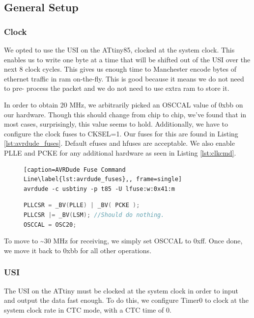 \documentclass{article}
\begin{document}
\subsection{General Setup}

\subsubsection{Clock}
We opted to
use the USI on the ATtiny85, clocked at the system clock.  This enables us to
write one byte at a time that will be shifted out of the USI over the next 8
clock cycles.  This gives us enough time to Manchester encode bytes of ethernet
traffic in ram on-the-fly.  This is good because it means we do not need to pre-
process the packet and we do not need to use extra ram to store it.

In order to obtain 20 MHz, we arbitrarily picked an OSCCAL value of 0xbb on our
hardware.  Though this should change from chip to chip, we've found that in most
cases, surprisingly, this value seems to hold.  Additionally, we have to configure
the clock fuses to CKSEL=1.  Our fuses for this are found in Listing \ref{lst:avrdude_fuses}.
Default efuses and hfuses are acceptable.  We also enable PLLE and PCKE for any additional
hardware as seen in Listing \ref{lst:clkcmd}.

\begin{figure}
\begin{lstlisting}[caption=AVRDude Fuse Command Line\label{lst:avrdude_fuses},, frame=single]
avrdude -c usbtiny -p t85 -U lfuse:w:0x41:m
\end{lstlisting}
\end{figure}

\begin{figure}
\begin{lstlisting}[caption=Clock Setup\label{lst:clkcmd},language=C, frame=single]
PLLCSR = _BV(PLLE) | _BV( PCKE );
PLLCSR |= _BV(LSM); //Should do nothing.
OSCCAL = OSC20;
\end{lstlisting}
\end{figure}


To move to \textasciitilde{}30 MHz for receiving, we simply set OSCCAL to 0xff.  Once done, we move it back to 0xbb for all other operations.

\subsubsection{USI}
The USI on the ATtiny must be clocked at the system clock in order to input and output the data fast enough.
To do this, we configure Timer0 to clock at the system clock rate in CTC mode, with a CTC time of 0.
\end{document}

